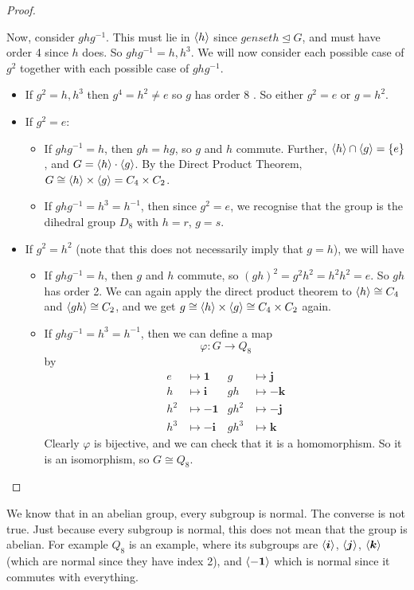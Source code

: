 \documentclass{article}
\begin{document}
\begin{proof}
\begin{itemize}
			Now, consider $ghg^{-1}$. This must lie in $\langle h \rangle$ since $genset{h} \trianglelefteq G$, and must have order 4 since $h$ does. So $ghg^{-1} = h, h^3$. We will now consider each possible case of $g^2$ together with each possible case of $ghg^{-1}$.
			\begin{itemize}
				\item If $g^2 = h, h^3$ then $g^4 = h^2 \neq e$ so $g$ has order 8 \contradiction. So either $g^2 = e$ or $g=h^2$.
				\item If $g^2 = e$:
				\begin{itemize}
					\item If $ghg^{-1} = h$, then $gh = hg$, so $g$ and $h$ commute. Further, $\langle h \rangle \cap \langle g \rangle = \{ e \}$, and $G = \langle h \rangle \cdot \langle g \rangle$. By the Direct Product Theorem, $G \cong \langle h \rangle \times \langle g \rangle = C_4 \times C_2$.
					\item If $ghg^{-1} = h^3 = h^{-1}$, then since $g^2 = e$, we recognise that the group is the dihedral group $D_8$ with $h=r$, $g=s$.
				\end{itemize}
				\item If $g^2 = h^2$ (note that this does not necessarily imply that $g=h$), we will have
				\begin{itemize}
					\item If $ghg^{-1} = h$, then $g$ and $h$ commute, so $(gh)^2 = g^2h^2 = h^2h^2 = e$. So $gh$ has order 2. We can again apply the direct product theorem to $\langle h \rangle \cong C_4$ and $\langle gh \rangle \cong C_2$, and we get $g \cong \langle h \rangle \times \langle g \rangle \cong C_4 \times C_2$ again.
					\item If $ghg^{-1} = h^3 = h^{-1}$, then we can define a map
					\[ \varphi \colon G \to Q_8 \]
					by
					\begin{align*}
						e &\mapsto \bm 1 & g &\mapsto \bm j \\
						h &\mapsto \bm i & gh &\mapsto -\bm k \\
						h^2 &\mapsto -\bm 1 & gh^2 &\mapsto -\bm j \\
						h^3 &\mapsto -\bm i & gh^3 &\mapsto \bm k
					\end{align*}
					Clearly $\varphi$ is bijective, and we can check that it is a homomorphism. So it is an isomorphism, so $G \cong Q_8$.
				\end{itemize}
			\end{itemize}
		\end{itemize}
	\end{proof}
	\begin{remark}
		We know that in an abelian group, every subgroup is normal. The converse is not true. Just because every subgroup is normal, this does not mean that the group is abelian. For example $Q_8$ is an example, where its subgroups are $\langle \bm i \rangle$, $\langle \bm j \rangle$, $\langle \bm k \rangle$ (which are normal since they have index 2), and $\langle -\bm 1 \rangle$ which is normal since it commutes with everything.
	\end{remark}
\end{document}
